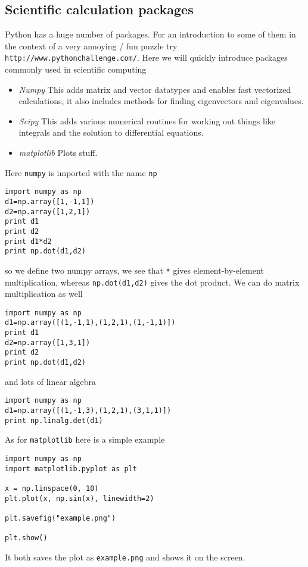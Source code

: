 \documentclass[11pt,a4paper]{scrartcl}
\begin{document}
\subsection*{Scientific calculation packages}

Python has a huge number of packages. For an introduction to some of
them in the context of a very annoying / fun puzzle try
\texttt{http://www.pythonchallenge.com/}. Here we will quickly
introduce packages commonly used in scientific computing 
\begin{itemize}
\item \textsl{Numpy} This adds matrix and vector datatypes and enables
  fast vectorized calculations, it also includes methods for finding
  eigenvectors and eigenvalues.
\item \textsl{Scipy} This adds various numerical routines for working out things like integrals and the solution to differential equations.
\item \textsl{matplotlib} Plots stuff.
\end{itemize}

Here \texttt{numpy} is imported with the name \texttt{np}
\begin{lstlisting}[numbers=right]
import numpy as np
d1=np.array([1,-1,1])
d2=np.array([1,2,1])
print d1
print d2
print d1*d2
print np.dot(d1,d2)
\end{lstlisting}
so we define two numpy arrays, we see that \texttt{*} gives element-by-element multiplication, whereas \texttt{np.dot(d1,d2)} gives the dot product. We can do matrix multiplication as well
\begin{lstlisting}[numbers=right]
import numpy as np
d1=np.array([(1,-1,1),(1,2,1),(1,-1,1)])
print d1
d2=np.array([1,3,1])
print d2
print np.dot(d1,d2)
\end{lstlisting}
and lots of linear algebra
\begin{lstlisting}[numbers=right]
import numpy as np
d1=np.array([(1,-1,3),(1,2,1),(3,1,1)])
print np.linalg.det(d1)
\end{lstlisting}

As for \texttt{matplotlib} here is a simple example
\begin{lstlisting}[numbers=right]
import numpy as np
import matplotlib.pyplot as plt

x = np.linspace(0, 10)
plt.plot(x, np.sin(x), linewidth=2)

plt.savefig("example.png")

plt.show()
\end{lstlisting}
It both saves the plot as \texttt{example.png} and shows it on the screen.
\end{document}
